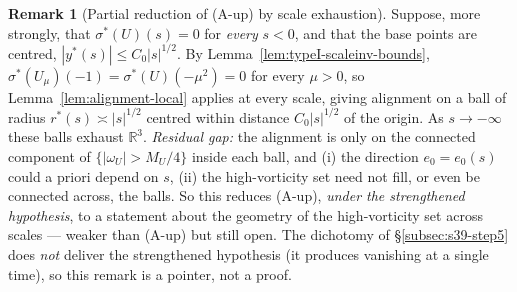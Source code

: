 \documentclass[11pt]{article}
\theoremstyle{definition}
\newtheorem{remark}[theorem]{Remark}
\theoremstyle{remark}
\newcommand{\R}{\mathbb{R}}
\begin{document}
\begin{remark}[Partial reduction of (A-up) by scale exhaustion]
  \label{rem:scale-exhaustion}
  Suppose, more strongly, that $\sigma^*(U)(s)=0$ for \emph{every} $s<0$, and
  that the base points are centred, $|y^*(s)|\leq C_0|s|^{1/2}$. By
  Lemma~\ref{lem:typeI-scaleinv-bounds}, $\sigma^*(U_\mu)(-1)=\sigma^*(U)(-\mu^2)=0$
  for every $\mu>0$, so Lemma~\ref{lem:alignment-local} applies at every
  scale, giving alignment on a ball of radius $r^*(s)\asymp|s|^{1/2}$
  centred within distance $C_0|s|^{1/2}$ of the origin. As $s\to-\infty$
  these balls exhaust $\R^3$. \emph{Residual gap:} the alignment is only on
  the connected component of $\{|\omega_U|>M_U/4\}$ inside each ball, and
  (i) the direction $e_0=e_0(s)$ could a priori depend on $s$, (ii) the
  high-vorticity set need not fill, or even be connected across, the balls.
  So this reduces (A-up), \emph{under the strengthened hypothesis}, to a
  statement about the geometry of the high-vorticity set across scales
  ---  weaker than (A-up) but still open. The dichotomy of
  \S\ref{subsec:s39-step5} does \emph{not} deliver the strengthened
  hypothesis (it produces vanishing at a single time), so this remark is a
  pointer, not a proof.
\end{remark}
\end{document}
